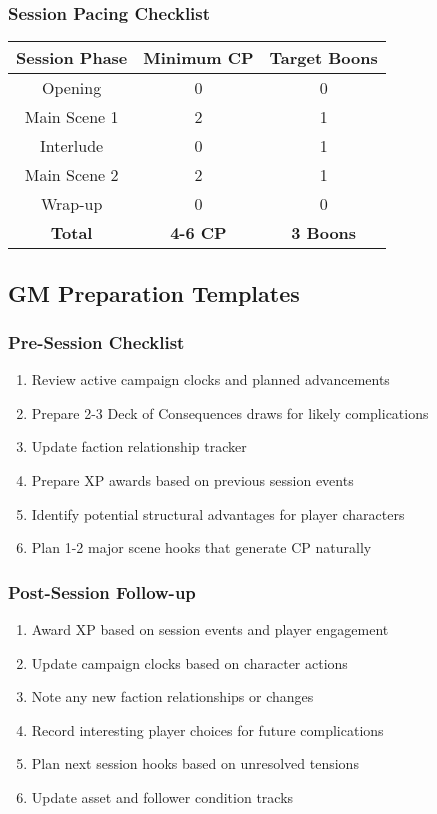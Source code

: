 \documentclass[11pt,letterpaper]{article}
\begin{document}
\subsubsection{Session Pacing Checklist}

\begin{center}
\begin{tabular}{|c|c|c|}
\hline
\textbf{Session Phase} & \textbf{Minimum CP} & \textbf{Target Boons} \\
\hline
Opening & 0 & 0 \\
\hline
Main Scene 1 & 2 & 1 \\
\hline
Interlude & 0 & 1 \\
\hline
Main Scene 2 & 2 & 1 \\
\hline
Wrap-up & 0 & 0 \\
\hline
\textbf{Total} & \textbf{4-6 CP} & \textbf{3 Boons} \\
\hline
\end{tabular}
\end{center}

\subsection{GM Preparation Templates}

\subsubsection{Pre-Session Checklist}

\begin{enumerate}
    \item Review active campaign clocks and planned advancements
    \item Prepare 2-3 Deck of Consequences draws for likely complications
    \item Update faction relationship tracker
    \item Prepare XP awards based on previous session events
    \item Identify potential structural advantages for player characters
    \item Plan 1-2 major scene hooks that generate CP naturally
\end{enumerate}

\subsubsection{Post-Session Follow-up}

\begin{enumerate}
    \item Award XP based on session events and player engagement
    \item Update campaign clocks based on character actions
    \item Note any new faction relationships or changes
    \item Record interesting player choices for future complications
    \item Plan next session hooks based on unresolved tensions
    \item Update asset and follower condition tracks
\end{enumerate}
\end{document}
